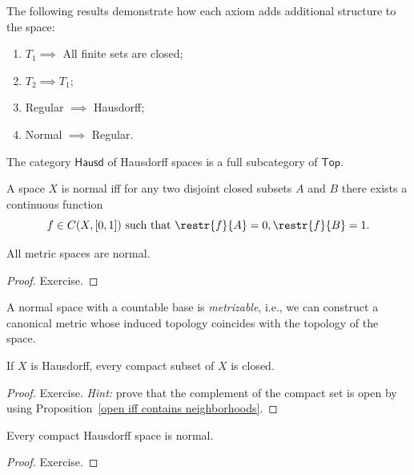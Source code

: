 \begin{prop}
    The following results demonstrate how each axiom adds additional structure to the space:
\begin{enumerate}
    \item $T_1 \implies$ All finite sets are closed;
    \item $T_2\implies T_1$;
    \item Regular $\implies$ Hausdorff;
    \item Normal $\implies$ Regular.
\end{enumerate}
\end{prop}

\begin{example}
    The category $\mathsf{Hausd}$ of Hausdorff spaces is a full subcategory of $\mathsf{Top}$.
\end{example}

\begin{thm}
    A space $X$ is normal iff for any two disjoint closed subsets $A$ and $B$ there exists a continuous function
\begin{equation}
f\in C(X,[0,1]) ~\text{such that}~ \restr{f}{A} = 0, \restr{f}{B} = 1.
\end{equation}
\end{thm}

\begin{thm}
    All metric spaces are normal.
\end{thm}
\begin{proof}
    Exercise.
\end{proof}

\begin{thm}[Urysohn]
    A normal space with a countable base is \emph{metrizable}, i.e., we can construct a canonical metric whose induced topology coincides with the topology of the space.
\end{thm}

\begin{prop}
    If $X$ is Hausdorff, every compact subset of $X$ is closed.
\end{prop}
\begin{proof}
    Exercise. \emph{Hint:} prove that the complement of the compact set is open by using Proposition~\ref{open iff contains neighborhoods}.
\end{proof}

\begin{prop}
    Every compact Hausdorff space is normal.
\end{prop}
\begin{proof}
    Exercise.
\end{proof}

